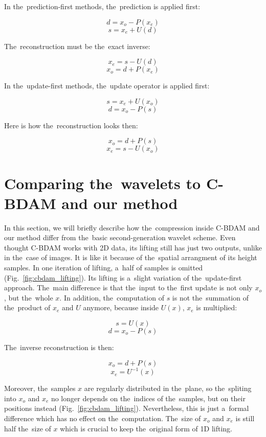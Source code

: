 In the~prediction-first methods, the~prediction is applied first:

$$d = x_o - P(x_e)$$
$$s = x_e + U(d)$$

The~reconstruction must be the~exact inverse:

$$x_e = s - U(d)$$
$$x_o = d + P(x_e)$$

In the~update-first methods, the~update operator is applied first:

$$s = x_e + U(x_o)$$
$$d = x_o - P(s)$$

Here is how the~reconstruction looks then:

$$x_o = d + P(s)$$
$$x_e = s - U(x_o)$$

\section{Comparing the~wavelets to C-BDAM and our method}\label{sec:wavelets_cbdam}

In this section, we will briefly describe how the~compression inside C-BDAM and our method differ from the~basic second-generation wavelet scheme. Even thought C-BDAM works with 2D data, its lifting still has just two outputs, unlike in the~case of images. It is like it because of the~spatial arrangment of its height samples. In one iteration of lifting, a~half of samples is omitted (Fig.~\ref{fig:cbdam_lifting}). Its lifting is a~slight variation of the~update-first approach. The~main difference is that the~input to the~first update is not only $x_o$, but the~whole $x$. In addition, the~computation of $s$ is not the~summation of the~product of $x_e$ and $U$ anymore, because inside $U(x)$, $x_e$ is multiplied:

$$s = U(x)$$
$$d = x_o - P(s)$$

The~inverse reconstruction is then:

$$x_o = d + P(s)$$
$$x_e = U^{-1}(x)$$

Moreover, the~samples $x$ are regularly distributed in the~plane, so the~spliting into $x_o$ and $x_e$ no longer depends on the~indices of the~samples, but on their positions instead (Fig.~\ref{fig:cbdam_lifting}). Nevertheless, this is just a~formal difference which has no effect on the~computation. The~size of $x_o$ and $x_e$ is still half the~size of $x$ which is crucial to keep the~original form of 1D lifting. 

